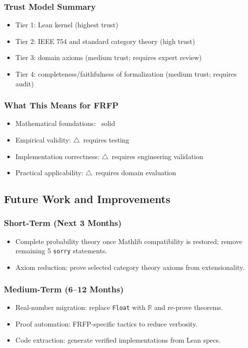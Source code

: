\subsubsection{Trust Model Summary}
\begin{itemize}
  \item Tier 1: Lean kernel (highest trust)
  \item Tier 2: IEEE 754 and standard category theory (high trust)
  \item Tier 3: domain axioms (medium trust; requires expert review)
  \item Tier 4: completeness/faithfulness of formalization (medium trust; requires audit)
\end{itemize}

\subsubsection{What This Means for FRFP}
\begin{itemize}
  \item Mathematical foundations: \checkmark\ solid
  \item Empirical validity: $\triangle$\ requires testing
  \item Implementation correctness: $\triangle$\ requires engineering validation
  \item Practical applicability: $\triangle$\ requires domain evaluation
\end{itemize}

\subsection{Future Work and Improvements}

\subsubsection{Short-Term (Next 3 Months)}
\begin{itemize}
  \item Complete probability theory once Mathlib compatibility is restored; remove remaining 5 \texttt{sorry} statements.
  \item Axiom reduction: prove selected category theory axioms from extensionality.
\end{itemize}

\subsubsection{Medium-Term (6--12 Months)}
\begin{itemize}
  \item Real-number migration: replace \texttt{Float} with $\mathbb{R}$ and re-prove theorems.
  \item Proof automation: FRFP-specific tactics to reduce verbosity.
  \item Code extraction: generate verified implementations from Lean specs.
\end{itemize}

